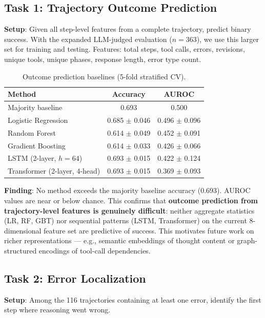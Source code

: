 \documentclass{article}
\begin{document}
\subsection{Task 1: Trajectory Outcome Prediction}

\textbf{Setup}: Given all step-level features from a complete trajectory, predict binary success. With the expanded LLM-judged evaluation ($n{=}363$), we use this larger set for training and testing. Features: total steps, tool calls, errors, revisions, unique tools, unique phases, response length, error type count.

\begin{table}[h]
\caption{Outcome prediction baselines (5-fold stratified CV).}
\label{tab:baselines}
\centering\small
\begin{tabular}{lcc}
\toprule
\textbf{Method} & \textbf{Accuracy} & \textbf{AUROC} \\
\midrule
Majority baseline & 0.693 & 0.500 \\
Logistic Regression & 0.685 $\pm$ 0.046 & 0.496 $\pm$ 0.096 \\
Random Forest & 0.614 $\pm$ 0.049 & 0.452 $\pm$ 0.091 \\
Gradient Boosting & 0.614 $\pm$ 0.033 & 0.426 $\pm$ 0.066 \\
LSTM (2-layer, $h{=}64$) & 0.693 $\pm$ 0.015 & 0.422 $\pm$ 0.124 \\
Transformer (2-layer, 4-head) & 0.693 $\pm$ 0.015 & 0.369 $\pm$ 0.093 \\
\bottomrule
\end{tabular}
\end{table}

\textbf{Finding}: No method exceeds the majority baseline accuracy (0.693). AUROC values are near or below chance. This confirms that \textbf{outcome prediction from trajectory-level features is genuinely difficult}: neither aggregate statistics (LR, RF, GBT) nor sequential patterns (LSTM, Transformer) on the current 8-dimensional feature set are predictive of success. This motivates future work on richer representations --- e.g., semantic embeddings of thought content or graph-structured encodings of tool-call dependencies.

\subsection{Task 2: Error Localization}

\textbf{Setup}: Among the 116 trajectories containing at least one error, identify the first step where reasoning went wrong.
\end{document}
